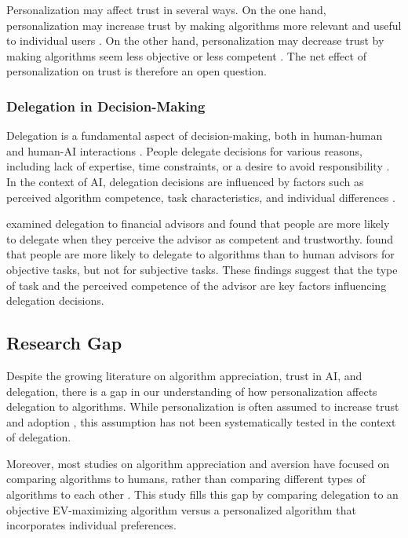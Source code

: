 Personalization may affect trust in several ways. On the one hand, personalization may increase trust by making algorithms more relevant and useful to individual users \citep{longoni2019}. On the other hand, personalization may decrease trust by making algorithms seem less objective or less competent \citep{castelo2019}. The net effect of personalization on trust is therefore an open question.

\subsubsection{Delegation in Decision-Making}

Delegation is a fundamental aspect of decision-making, both in human-human and human-AI interactions \citep{freer2023, ivanovastenzel2025}. People delegate decisions for various reasons, including lack of expertise, time constraints, or a desire to avoid responsibility \citep{freer2023}. In the context of AI, delegation decisions are influenced by factors such as perceived algorithm competence, task characteristics, and individual differences \citep{holzmeister2023, gazit2023}.

\citet{holzmeister2023} examined delegation to financial advisors and found that people are more likely to delegate when they perceive the advisor as competent and trustworthy. \citet{gazit2023} found that people are more likely to delegate to algorithms than to human advisors for objective tasks, but not for subjective tasks. These findings suggest that the type of task and the perceived competence of the advisor are key factors influencing delegation decisions.

\subsection{Research Gap}

Despite the growing literature on algorithm appreciation, trust in AI, and delegation, there is a gap in our understanding of how personalization affects delegation to algorithms. While personalization is often assumed to increase trust and adoption \citep{longoni2019, jussupow2020}, this assumption has not been systematically tested in the context of delegation.

Moreover, most studies on algorithm appreciation and aversion have focused on comparing algorithms to humans, rather than comparing different types of algorithms to each other \citep{dietvorst2015, logg2019}. This study fills this gap by comparing delegation to an objective EV-maximizing algorithm versus a personalized algorithm that incorporates individual preferences.

